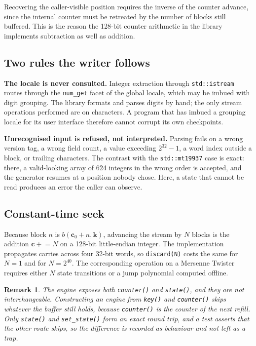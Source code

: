 \documentclass[acmsmall,screen,review]{acmart}
\theoremstyle{acmdefinition}
\newtheorem{remark}{Remark}
\newcommand{\ctr}{\mathbf{c}}
\newcommand{\key}{\mathbf{k}}
\newcommand{\code}[1]{\texttt{#1}}
\begin{document}
Recovering the caller-visible position requires the inverse of the counter
advance, since the internal counter must be retreated by the number of blocks
still buffered. This is the reason the 128-bit counter arithmetic in the
library implements subtraction as well as addition.

\subsection{Two rules the writer follows}

\textbf{The locale is never consulted.} Integer extraction through
\code{std::istream} routes through the \code{num\_get} facet of the global
locale, which may be imbued with digit grouping. The library formats and parses
digits by hand; the only stream operations performed are on characters. A
program that has imbued a grouping locale for its user interface therefore
cannot corrupt its own checkpoints.

\textbf{Unrecognised input is refused, not interpreted.} Parsing fails on a
wrong version tag, a wrong field count, a value exceeding $2^{32}-1$, a word
index outside a block, or trailing characters. The contrast with the
\code{std::mt19937} case is exact: there, a valid-looking array of 624 integers
in the wrong order is accepted, and the generator resumes at a position nobody
chose. Here, a state that cannot be read produces an error the caller can
observe.

\subsection{Constant-time seek}

Because block $n$ is $b(\ctr_0 + n, \key)$, advancing the stream by $N$ blocks
is the addition $\ctr \mathrel{+}= N$ on a 128-bit little-endian integer. The
implementation propagates carries across four 32-bit words, so
\code{discard(N)} costs the same for $N = 1$ and for $N = 2^{40}$. The
corresponding operation on a Mersenne Twister requires either $N$ state
transitions or a jump polynomial computed offline.

\begin{remark}
The engine exposes both \code{counter()} and \code{state()}, and they are not
interchangeable. Constructing an engine from \code{key()} and \code{counter()}
skips whatever the buffer still holds, because \code{counter()} is the counter
of the \emph{next refill}. Only \code{state()} and \code{set\_state()} form an
exact round trip, and a test asserts that the other route skips, so the
difference is recorded as behaviour and not left as a trap.
\end{remark}
\end{document}
